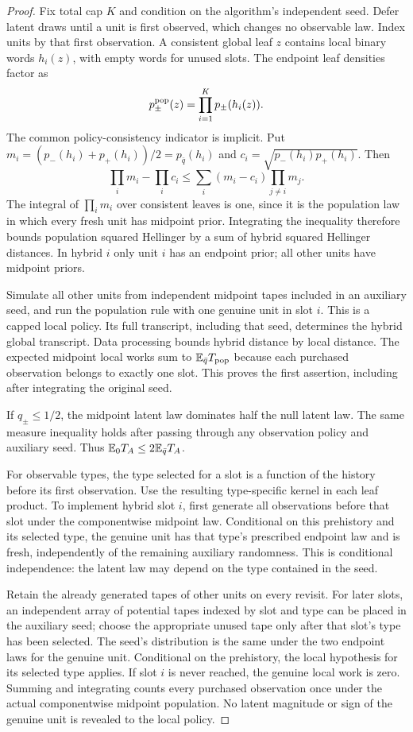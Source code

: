 \begin{proof}
Fix total cap $K$ and condition on the algorithm's independent seed.
Defer latent draws until a unit is first observed, which changes no
observable law. Index units by that first observation. A consistent global leaf $z$
contains local binary words $h_i(z)$, with empty words for unused slots.
The endpoint leaf densities factor as
\[
 p_\pm^{\rm pop}(z)=\prod_{i=1}^K p_\pm(h_i(z)).
\]
The common policy-consistency indicator is implicit. Put
$m_i=(p_-(h_i)+p_+(h_i))/2=p_{\bar q}(h_i)$ and
$c_i=\sqrt{p_-(h_i)p_+(h_i)}$. Then
\[
 \prod_i m_i-\prod_i c_i
 \le\sum_i(m_i-c_i)\prod_{j\ne i}m_j.
\]
The integral of $\prod_i m_i$ over consistent leaves is one, since it
is the population law in which every fresh unit has midpoint prior.
Integrating the inequality therefore bounds population squared Hellinger
by a sum of hybrid squared Hellinger distances. In hybrid $i$ only
unit $i$ has an endpoint prior; all other units have midpoint priors.

Simulate all other units from independent midpoint tapes included in
an auxiliary seed, and run the population rule with one genuine unit
in slot $i$. This is a capped local policy. Its full transcript,
including that seed, determines the hybrid global transcript.
Data processing bounds hybrid distance by local distance. The expected
midpoint local works sum to $\mathbb E_{\bar q}T_{\rm pop}$ because each
purchased observation belongs to exactly one slot. This proves the
first assertion, including after integrating the original seed.

If $q_\pm\le1/2$, the midpoint latent law dominates half the null
latent law. The same measure inequality holds after passing through
any observation policy and auxiliary seed. Thus
$\mathbb E_0T_A\le2\mathbb E_{\bar q}T_A$.

For observable types, the type selected for a slot is a function of the
history before its first observation. Use the resulting type-specific
kernel in each leaf product. To implement hybrid slot $i$, first generate
all observations before that slot under the componentwise midpoint law.
Conditional on this prehistory and its selected type, the genuine unit
has that type's prescribed endpoint law and is fresh, independently of
the remaining auxiliary randomness. This is conditional independence:
the latent law may depend on the type contained in the seed.

Retain the already generated tapes of other units on every revisit.
For later slots, an independent array of potential tapes indexed by slot
and type can be placed in the auxiliary seed; choose the appropriate
unused tape only after that slot's type has been selected. The seed's
distribution is the same under the two endpoint laws for the genuine
unit. Conditional on the prehistory, the local hypothesis for its selected
type applies. If slot $i$ is never reached, the genuine local work is zero.
Summing and integrating counts every purchased observation once under
the actual componentwise midpoint population. No latent magnitude or
sign of the genuine unit is revealed to the local policy.
\end{proof}

